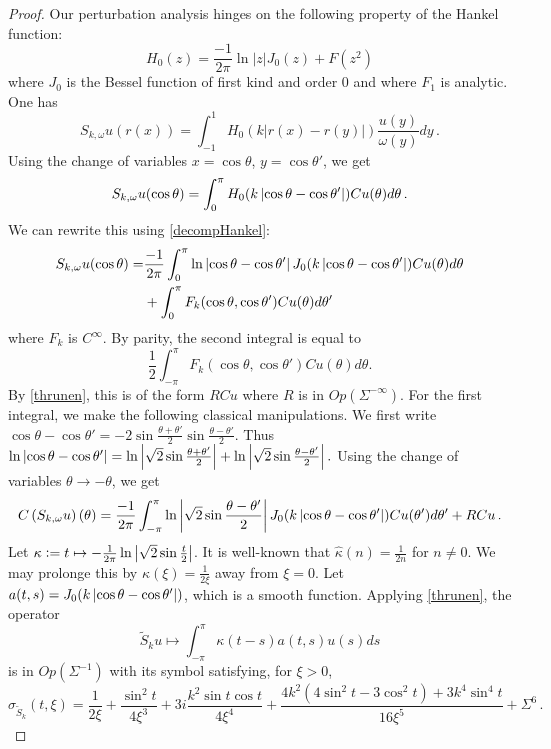 \documentclass[a4paper]{article}
\begin{document}
\begin{proof}
	Our perturbation analysis hinges on the following property of the Hankel function:
	\begin{equation}
	\label{decompHankel}
	H_0(z) = \frac{-1}{2\pi}\ln|z| J_0(z) + F(z^2)
	\end{equation}
	where $J_0$ is the Bessel function of first kind and order $0$ and where $F_1$ is analytic. One has
	\[S_{k,\omega} u(r(x)) = \int_{-1}^1 H_0(k|r(x) - r(y)|)\frac{u(y)}{\omega(y)}dy\,.\]
	Using the change of variables $x = \cos\theta$, $y = \cos \theta'$, we get 
	\[ S_{k,\omega} u(\cos \theta) = \int_{0}^\pi H_0(k \left\lvert \cos \theta - \cos \theta' \right\rvert) Cu(\theta) d\theta\,.\]
	We can rewrite this using \eqref{decompHankel}:
	\[\begin{split}
	S_{k,\omega} u(\cos \theta) = &\frac{-1}{2\pi}\int_{0}^\pi \ln \left\lvert \cos \theta - \cos \theta' \right\rvert J_0(k \left\lvert \cos \theta - \cos \theta' \right\rvert)Cu(\theta) d\theta \\
	&+ \int_{0}^\pi F_k(\cos\theta,\cos\theta') Cu(\theta) d\theta'
	\end{split}\]
	where $F_k$ is $C^\infty$.
	By parity, the second integral is equal to 
	\[\frac{1}{2} \int_{-\pi}^{\pi} F_k(\cos\theta,\cos\theta') Cu(\theta) d\theta.\]
	By \autoref{thrunen}, this is of the form $RCu$ where $R$ is in $\textit{Op}(\Sigma^{-\infty})$. For the first integral, we make the following classical manipulations. We first write $\cos \theta - \cos\theta' = - 2 \sin \frac{\theta + \theta'}{2}\sin \frac{\theta - \theta'}{2}$. Thus $\ln\left\lvert \cos \theta - \cos\theta' \right\rvert= \ln \left\lvert \sqrt{2} \sin \frac{\theta + \theta'}{2} \right\rvert + \ln \left\lvert \sqrt{2}\sin \frac{\theta - \theta'}{2} \right\rvert.$ Using the change of variables $\theta \to - \theta$, we get 
	\[C\left(S_{k,\omega}u\right)(\theta) = \frac{-1}{2\pi} \int_{-\pi}^\pi \ln \left\lvert \sqrt{2} \sin \frac{\theta - \theta'}{2} \right\rvert J_0(k\left\lvert \cos\theta - \cos \theta' \right\rvert)Cu(\theta')d\theta' + RCu\,.\]
	Let $\kappa \mathrel{\mathop:}= t \mapsto -\frac{1}{2\pi}\ln \left\lvert \sqrt{2} \sin \frac{t}{2} \right\rvert$. It is well-known that $\hat{\kappa}(n) = \frac{1}{2n}$ for $n \neq 0$. We may prolonge this by $\kappa(\xi) = \frac{1}{2\xi}$ away from $\xi = 0$. Let $a(t,s) = J_0(k\left\lvert \cos\theta - \cos \theta' \right\rvert)$, which is a smooth function. Applying \autoref{thrunen}, the operator
	\[\tilde{S}_k u \mapsto \int_{-\pi}^\pi \kappa(t-s) a(t,s)u(s)ds\]
	is in $\textit{Op}(\Sigma^{-1})$ with its symbol satisfying, for $\xi > 0$,
	\[\sigma_{\tilde{S}_k}(t,\xi) = \frac{1}{2\xi} + \frac{\sin^2 t}{4\xi^3} + 3i\frac{k^2 \sin t \cos t}{4\xi^4}  + \frac{4k^2(4\sin^2t - 3 \cos^2t) + 3k^4\sin^4 t}{16 \xi^5} + \Sigma^6\,.\]

\end{proof}
\end{document}
